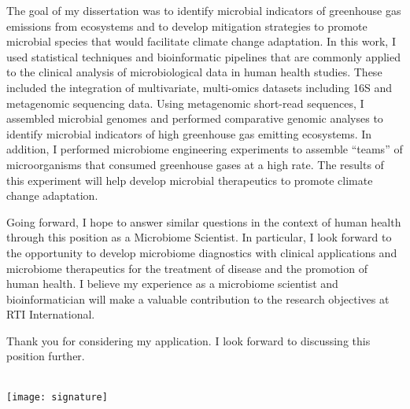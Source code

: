 \documentclass[11pt,letterpaper,sans]{moderncv}        %
\makeatletter
\renewcommand*{\makeletterclosing}{
  \@closing\\[3em]%
  \texttt{[image: signature]}\\%
  {\bfseries \@firstname~\@lastname}%
  \ifthenelse{\isundefined{\@enclosure}}{}{%
    \\%
    \vfill%
    {\color{color2}\itshape\enclname: \@enclosure}}}
\makeatother
\begin{document}
The goal of my dissertation was to identify microbial indicators of greenhouse
gas emissions from ecosystems and to develop mitigation strategies to promote
microbial species that would facilitate climate change adaptation. 
In this work, I used statistical techniques and bioinformatic
pipelines that are commonly applied to the clinical analysis of microbiological
data in human health studies. These included the integration of multivariate,
multi-omics datasets including 16S and metagenomic sequencing data. Using
metagenomic short-read sequences, I assembled microbial genomes and performed
comparative genomic analyses to identify microbial indicators of high
greenhouse gas emitting ecosystems. In addition, I performed microbiome engineering
experiments to assemble ``teams'' of microorganisms that consumed greenhouse
gases at a high rate. The results of this experiment will help develop
microbial therapeutics to promote climate change adaptation.

Going forward, I hope to answer similar questions in the context of human
health through this position as a Microbiome Scientist. In particular, I look
forward to the opportunity to develop microbiome diagnostics with clinical
applications and microbiome therapeutics for the treatment of disease and the
promotion of human health. I believe my experience as a microbiome scientist
and bioinformatician will make a valuable contribution to the research
objectives at RTI International.

Thank you for considering my application. I look forward to discussing this
position further.


\makeletterclosing

\end{document}

